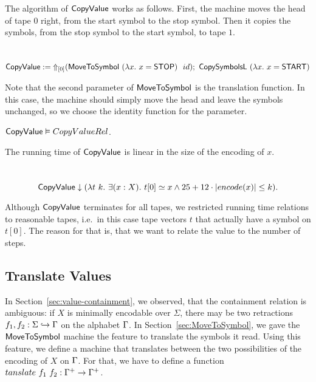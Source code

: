 The algorithm of $\MS{CopyValue}$ works as follows.  First, the machine moves the head of tape $0$ right, from the start symbol to the stop symbol.
Then it copies the symbols, from the stop symbol to the start symbol, to tape $1$.

\begin{definition}[$\MS{CopyValue}$][CopyValue]
  \label{def:CopyValue}
  ~
  \small
  \[
    \MS{CopyValue} := \LiftTapes{(\MS{MoveToSymbol}~(\lambda x.~x=\MS{STOP})~~id)}{\Vector{0}} \Seq \MS{CopySymbolsL}~(\lambda x.~x=\MS{START})
  \]
\end{definition}

Note that the second parameter of $\MS{MoveToSymbol}$ is the translation function.  In this case, the machine should simply move the head and leave
the symbols unchanged, so we choose the identity function for the parameter.

\begin{lemma}
  \label{lem:CopyValue_Realise}
  $\MS{CopyValue} \Realise CopyValueRel$.
\end{lemma}

The running time of $\MS{CopyValue}$ is linear in the size of the encoding of $x$.
\begin{lemma}
  \label{lem:CopyValue_TerminatesIn}
  ~
  \[
    \MS{CopyValue} \TerminatesIn (\lambda t~k.~\exists(x:X).~t[0] \simeq x \land 25 + 12 \cdot \size{x} \leq k).
  \]
\end{lemma}

Although $\MS{CopyValue}$ terminates for all tapes, we restricted running time relations to reasonable tapes, i.e.\ in this case tape vectors $t$ that
actually have a symbol on $t[0]$.  The reason for that is, that we want to relate the value to the number of steps.

\subsection{Translate Values}
\label{sec:Translate}

In Section~\ref{sec:value-containment}, we observed, that the containment relation is ambiguous: if $X$ is minimally encodable over $\Sigma$, there
may be two retractions $f_1, f_2 : \Sigma \hookrightarrow \Tau$ on the alphabet $\Tau$.  In Section~\ref{sec:MoveToSymbol}, we gave the
$\MS{MoveToSymbol}$ machine the feature to translate the symbols it read.  Using this feature, we define a machine that translates between the two
possibilities of the encoding of $X$ on $\Tau$.  For that, we have to define a function $tanslate~f_1~f_2 : \Tau^+ \to \Tau^+$.

